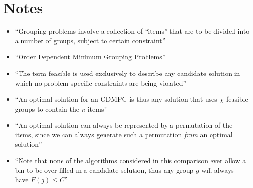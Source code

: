 \documentclass{elsarticle}
\begin{document}
\section{Notes}
\begin{itemize}
	\item ``Grouping problems involve a collection of ``items'' that are to be divided into a number of groups, subject to certain constraint'' \cite{lewis2009}
	\item ``Order Dependent Minimum Grouping Problems'' \cite{lewis2009}
	\item ``The term feasible is used exclusively to describe any candidate solution in which no problem-specific constraints are being violated'' \cite{lewis2009}
	\item ``An optimal solution for an ODMPG is thus any solution that uses $\chi$ feasible groups to contain the $n$ items'' \cite{lewis2009}
	\item ``An optimal solution can always be represented by a permutation of the items, since we can always generate such a permutation \textit{from} an optimal solution'' \cite{lewis2009}
	\item ``Note that none of the algorithms considered in this comparison ever allow a bin to be over-filled in a candidate solution, thus any group $g$ will always have $F(g) \leq C$'' \cite{lewis2009}
\end{itemize}
\end{document}
